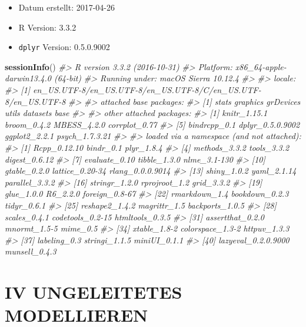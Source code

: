 \documentclass[12pt,ngerman,]{book}
\newenvironment{Shaded}{\begin{snugshade}}{\end{snugshade}}
\newcommand{\KeywordTok}[1]{\textcolor[rgb]{0.13,0.29,0.53}{\textbf{{#1}}}}
\newcommand{\CommentTok}[1]{\textcolor[rgb]{0.56,0.35,0.01}{\textit{{#1}}}}
\newcommand{\NormalTok}[1]{{#1}}
\providecommand{\tightlist}{%
  \setlength{\itemsep}{0pt}\setlength{\parskip}{0pt}}
\renewenvironment{Shaded}{\begin{kframe}}{\end{kframe}}
\begin{document}
\begin{itemize}
\tightlist
\item
  Datum erstellt: 2017-04-26
\item
  R Version: 3.3.2
\item
  \texttt{dplyr} Version: 0.5.0.9002
\end{itemize}

\begin{Shaded}
\begin{Highlighting}[]
\KeywordTok{sessionInfo}\NormalTok{()}
\CommentTok{#> R version 3.3.2 (2016-10-31)}
\CommentTok{#> Platform: x86_64-apple-darwin13.4.0 (64-bit)}
\CommentTok{#> Running under: macOS Sierra 10.12.4}
\CommentTok{#> }
\CommentTok{#> locale:}
\CommentTok{#> [1] en_US.UTF-8/en_US.UTF-8/en_US.UTF-8/C/en_US.UTF-8/en_US.UTF-8}
\CommentTok{#> }
\CommentTok{#> attached base packages:}
\CommentTok{#> [1] stats     graphics  grDevices utils     datasets  base     }
\CommentTok{#> }
\CommentTok{#> other attached packages:}
\CommentTok{#> [1] knitr_1.15.1     broom_0.4.2      MBESS_4.2.0      corrplot_0.77   }
\CommentTok{#> [5] bindrcpp_0.1     dplyr_0.5.0.9002 ggplot2_2.2.1    psych_1.7.3.21  }
\CommentTok{#> }
\CommentTok{#> loaded via a namespace (and not attached):}
\CommentTok{#>  [1] Rcpp_0.12.10        bindr_0.1           plyr_1.8.4         }
\CommentTok{#>  [4] methods_3.3.2       tools_3.3.2         digest_0.6.12      }
\CommentTok{#>  [7] evaluate_0.10       tibble_1.3.0        nlme_3.1-130       }
\CommentTok{#> [10] gtable_0.2.0        lattice_0.20-34     rlang_0.0.0.9014   }
\CommentTok{#> [13] shiny_1.0.2         yaml_2.1.14         parallel_3.3.2     }
\CommentTok{#> [16] stringr_1.2.0       rprojroot_1.2       grid_3.3.2         }
\CommentTok{#> [19] glue_1.0.0          R6_2.2.0            foreign_0.8-67     }
\CommentTok{#> [22] rmarkdown_1.4       bookdown_0.2.3      tidyr_0.6.1        }
\CommentTok{#> [25] reshape2_1.4.2      magrittr_1.5        backports_1.0.5    }
\CommentTok{#> [28] scales_0.4.1        codetools_0.2-15    htmltools_0.3.5    }
\CommentTok{#> [31] assertthat_0.2.0    mnormt_1.5-5        mime_0.5           }
\CommentTok{#> [34] xtable_1.8-2        colorspace_1.3-2    httpuv_1.3.3       }
\CommentTok{#> [37] labeling_0.3        stringi_1.1.5       miniUI_0.1.1       }
\CommentTok{#> [40] lazyeval_0.2.0.9000 munsell_0.4.3}
\end{Highlighting}
\end{Shaded}

\chapter*{IV UNGELEITETES
MODELLIEREN}\label{iv-ungeleitetes-modellieren}
\end{document}
